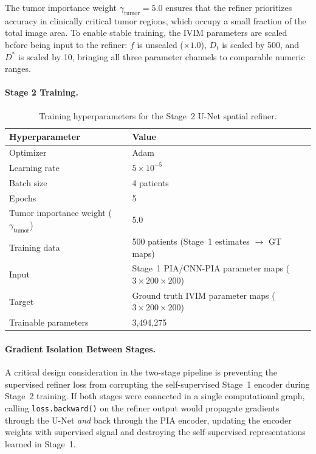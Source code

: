 \documentclass[12pt]{article}
\begin{document}
The tumor importance weight $\gamma_{\text{tumor}} = 5.0$ ensures that the refiner prioritizes accuracy in clinically critical tumor regions, which occupy a small fraction of the total image area. To enable stable training, the IVIM parameters are scaled before being input to the refiner: $f$ is unscaled ($\times 1.0$), $D_t$ is scaled by 500, and $D^*$ is scaled by 10, bringing all three parameter channels to comparable numeric ranges.

\paragraph{Stage 2 Training.}

\begin{table}[h]
\centering
\caption{Training hyperparameters for the Stage~2 U-Net spatial refiner.}
\label{tab:stage2_hyperparams}
\begin{tabular}{ll}
\toprule
\textbf{Hyperparameter} & \textbf{Value} \\
\midrule
Optimizer                              & Adam \\
Learning rate                          & $5 \times 10^{-5}$ \\
Batch size                             & 4 patients \\
Epochs                                 & 5 \\
Tumor importance weight ($\gamma_{\text{tumor}}$) & 5.0 \\
Training data                          & 500 patients (Stage~1 estimates $\to$ GT maps) \\
Input                                  & Stage~1 PIA/CNN-PIA parameter maps ($3 \times 200 \times 200$) \\
Target                                 & Ground truth IVIM parameter maps ($3 \times 200 \times 200$) \\
Trainable parameters                   & 3,494,275 \\
\bottomrule
\end{tabular}
\end{table}

\paragraph{Gradient Isolation Between Stages.}
A critical design consideration in the two-stage pipeline is preventing the supervised refiner loss from corrupting the self-supervised Stage~1 encoder during Stage~2 training. If both stages were connected in a single computational graph, calling \texttt{loss.backward()} on the refiner output would propagate gradients through the U-Net \emph{and} back through the PIA encoder, updating the encoder weights with supervised signal and destroying the self-supervised representations learned in Stage~1.
\end{document}
